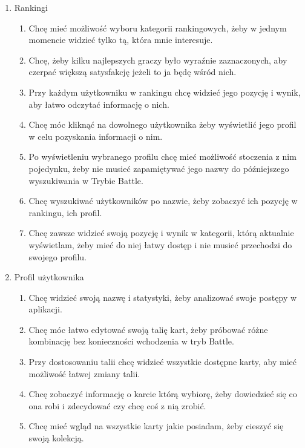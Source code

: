 \documentclass{article}
\begin{document}
\begin{tcolorbox}
\begin{enumerate}
\begin{enumerate}
\begin{enumerate}
                        \end{enumerate}
                  \item Rankingi
                        \begin{enumerate}
                            \item Chcę mieć możliwość wyboru kategorii rankingowych, żeby w jednym momencie widzieć tylko tą, która mnie interesuje.
                            \item Chcę, żeby kilku najlepszych graczy było wyraźnie zaznaczonych, aby czerpać większą satysfakcję jeżeli to ja będę wśród nich.
                            \item Przy każdym użytkowniku w rankingu chcę widzieć jego pozycję i wynik, aby łatwo odczytać informację o nich.
                            \item Chcę móc kliknąć na dowolnego użytkownika żeby wyświetlić jego profil w celu pozyskania informacji o nim.
                            \item Po wyświetleniu wybranego profilu chcę mieć możliwość stoczenia z nim pojedynku, żeby nie musieć zapamiętywać jego nazwy do późniejszego wyszukiwania w Trybie Battle.
                            \item Chcę wyszukiwać użytkowników po nazwie, żeby zobaczyć ich pozycję w rankingu, ich profil.
                            \item Chcę zawsze widzieć swoją pozycję i wynik w kategorii, którą aktualnie wyświetlam, żeby mieć do niej łatwy dostęp i nie musieć przechodzi do swojego profilu.
                        \end{enumerate}
                  \item Profil użytkownika
                        \begin{enumerate}
                            \item Chcę widzieć swoją nazwę i statystyki, żeby analizować swoje postępy w aplikacji.
                            \item Chcę móc łatwo edytować swoją talię kart, żeby próbować różne kombinację bez konieczności wchodzenia w tryb Battle.
                            \item Przy dostosowaniu talii chcę widzieć wszystkie dostępne karty, aby mieć możliwość łatwej zmiany talii.
                            \item Chcę zobaczyć informację o karcie którą wybiorę, żeby dowiedzieć się co ona robi i zdecydować czy chcę coś z nią zrobić.
                            \item Chcę mieć wgląd na wszystkie karty jakie posiadam, żeby cieszyć się swoją kolekcją.

\end{enumerate}
\end{enumerate}
\end{enumerate}
\end{tcolorbox}
\end{document}
